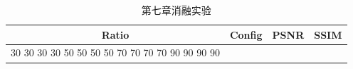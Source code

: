 \begin{table}[htbp]
\centering
\caption{第七章消融实验}
\label{tab:chapter7_ablation}
\small
\begin{tabular}{|c|c|c|c|}
\hline
Ratio & Config & PSNR & SSIM \\
\hline
30%
30%
30%
30%
50%
50%
50%
50%
70%
70%
70%
70%
90%
90%
90%
90%
\hline
\end{tabular}
\end{table}
